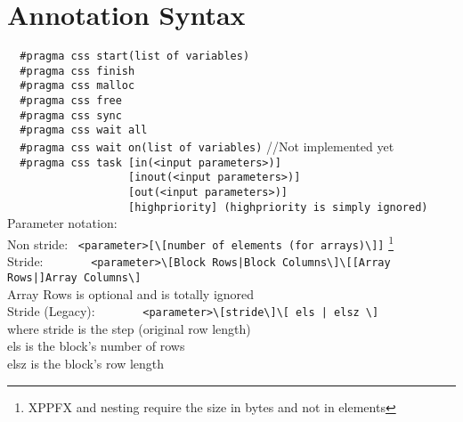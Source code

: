\documentclass[
a4paper,
12pt,
]{article}
\begin{document}
\newpage
\tableofcontents{}
\newpage
{}
\pagestyle{headings}

\section{Annotation Syntax}

    \verb!  #pragma css start(list of variables)!\\
    \verb!  #pragma css finish!\\
    \verb!  #pragma css malloc!\\
    \verb!  #pragma css free!\\
    \verb!  #pragma css sync!\\
    \verb!  #pragma css wait all!\\
    \verb!  #pragma css wait on(list of variables)! //Not implemented yet\\
    \verb!  #pragma css task [in(<input parameters>)]!\\
    \verb!                   [inout(<input parameters>)]!\\
    \verb!                   [out(<input parameters>)]!\\
    \verb!                   [highpriority] (highpriority is simply ignored)!\\[1em]
    Parameter notation:\\

      Non stride: \ \verb!<parameter>[\[number of elements (for arrays)\]]!
      \footnote{XPPFX and nesting require the size in bytes and not in elements}\\

      Stride: \ \ \ \ \ \ \ \verb!<parameter>\[Block Rows|Block Columns\]\[[Array Rows|]Array Columns\]!\\
        \hspace{2cm}Array Rows is optional and is totally ignored\\

      Stride (Legacy): \ \ \ \ \ \ \ \verb!<parameter>\[stride\]\[ els | elsz \]!\\
        \hspace{2cm}where stride is the step (original row length)\\
        \hspace{2cm}els is the block's number of rows\\
        \hspace{2cm}elsz is the block's row length\\
\end{document}
